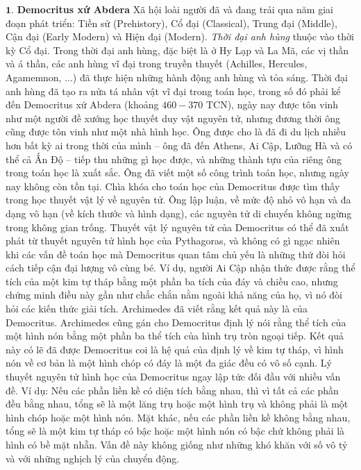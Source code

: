 \begin{multicols}{2}
	$\pmb{1}$. \textbf{\color{lichsutoanhoc}Democritus xứ Abdera} 
	\vskip 0.1cm
	Xã hội loài người đã và đang trải qua năm giai đoạn phát triển: Tiền sử (Prehistory), Cổ đại (Classical), Trung đại (Middle), Cận đại (Early Modern) và Hiện đại (Modern). \textit{Thời đại anh hùng} thuộc vào thời kỳ Cổ đại. Trong thời đại anh hùng, đặc biệt là ở Hy Lạp và La Mã, các vị thần và á thần, các anh hùng vĩ đại trong truyền thuyết (Achilles, Hercules, Agamemnon, ...)  đã thực hiện những hành động anh hùng và tỏa sáng. 
	\vskip 0.1cm
	Thời đại anh hùng đã tạo ra nửa tá nhân vật vĩ đại trong toán học, trong số đó phải kể đến Democritus xứ Abdera (khoảng $460-370$ TCN), ngày nay được tôn vinh như một người đề xướng học thuyết duy vật nguyên tử, nhưng đương thời ông cũng được tôn vinh như một nhà hình học. Ông được cho là đã đi du lịch nhiều hơn bất kỳ ai trong thời của mình -- ông đã đến Athens, Ai Cập, Lưỡng Hà và có thể cả Ấn Độ -- tiếp thu những gì học được, và những thành tựu của riêng ông trong toán học là xuất sắc. Ông đã viết một số công trình toán học, nhưng ngày nay không còn tồn tại. 
	\vskip 0.1cm
	Chìa khóa cho toán học của Democritus được tìm thấy trong học thuyết vật lý về nguyên tử. Ông lập luận, về mức độ nhỏ vô hạn và đa dạng vô hạn (về kích thước và hình dạng), các nguyên tử di chuyển không ngừng trong không gian trống.
	\vskip 0.1cm 
	Thuyết vật lý nguyên tử của Democritus có thể đã xuất phát từ thuyết nguyên tử hình học của Pythagoras, và không có gì ngạc nhiên khi các vấn đề toán học mà Democritus quan tâm chủ yếu là những thứ đòi hỏi cách tiếp cận đại lượng vô cùng bé. Ví dụ, người Ai Cập nhận thức được rằng thể tích của một kim tự tháp bằng một phần ba tích của đáy và chiều cao, nhưng chứng minh điều này gần như chắc chắn nằm ngoài khả năng của họ, vì nó đòi hỏi các kiến thức giải tích.  Archimedes đã viết rằng kết quả này là của Democritus.  Archimedes cũng gán cho Democritus định lý nói  rằng thể tích của một hình nón bằng một phần ba thể tích của hình trụ tròn ngoại tiếp. Kết quả này có lẽ đã được Democritus coi là hệ quả của định lý về kim tự tháp, vì hình nón về cơ bản là một hình chóp có đáy là một đa giác đều có vô số cạnh.
	\vskip 0.1cm
	Lý thuyết nguyên tử hình học của Democritus ngay lập tức đối đầu với nhiều vấn đề. Ví dụ: Nếu các phần liền kề có diện tích bằng nhau, thì vì tất cả các phần đều bằng nhau, tổng sẽ là một lăng trụ hoặc một hình trụ và không phải là một hình chóp hoặc một hình nón. 
	\vskip 0.1cm
	Mặt khác, nếu các phần liền kề không bằng nhau, tổng sẽ là một kim tự tháp có bậc hoặc một hình nón có bậc chứ không phải là hình có bề mặt nhẵn. Vấn đề này không giống như những khó khăn với số vô tỷ và với những nghịch lý của chuyển động.

\end{multicols}

